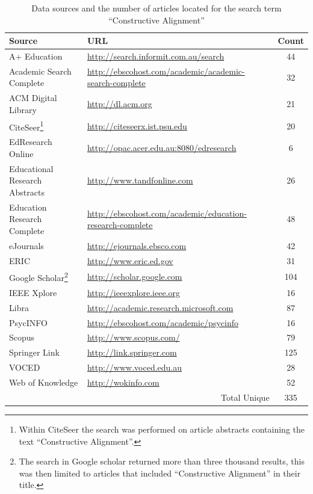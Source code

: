 \begin{savenotes}
\begin{table}[htb]
	\centering
	\caption{Data sources and the number of articles located for the search term ``Constructive Alignment''}
	\label{tbl:review_source}
	\footnotesize
    \begin{tabular}{l|l|c}
    \textbf{Source} & \textbf{URL} & \textbf{Count} \\ \hline
    A+ Education & \url{http://search.informit.com.au/search} & 44 \\
    Academic Search Complete & \scriptsize \url{http://ebscohost.com/academic/academic-search-complete} & 32 \\
    ACM Digital Library & \url{http://dl.acm.org} & 21 \\
    CiteSeer\footnote{Within CiteSeer the search was performed on article abstracts containing the text ``Constructive Alignment''.}  & \url{http://citeseerx.ist.psu.edu} & 20 \\
    EdResearch Online & \url{http://opac.acer.edu.au:8080/edresearch} & 6 \\
    \scriptsize Educational Research Abstracts & \url{http://www.tandfonline.com} & 26 \\
    \scriptsize Education Research Complete & \scriptsize \url{http://ebscohost.com/academic/education-research-complete} & 48 \\
    eJournals & \url{http://ejournals.ebsco.com} & 42 \\
    ERIC & \url{http://www.eric.ed.gov} & 31 \\
    Google Scholar\footnote{The search in Google scholar returned more than three thousand results, this was then limited to articles that included ``Constructive Alignment'' in their title.} & \url{http://scholar.google.com} & 104 \\
    IEEE Xplore & \url{http://ieeexplore.ieee.org} & 16 \\
    Libra & \url{http://academic.research.microsoft.com} & 87\\
	PsycINFO & \url{http://ebscohost.com/academic/psycinfo} & 16 \\
	Scopus & \url{http://www.scopus.com/} & 79 \\
	Springer Link & \url{http://link.springer.com} & 125 \\
	VOCED & \url{http://www.voced.edu.au} & 28 \\
	Web of Knowledge & \url{http://wokinfo.com} & 52 \\ \hline
	\multicolumn{2}{r|}{Total Unique} & 335 \\
    \end{tabular}
\end{table}
\end{savenotes}

